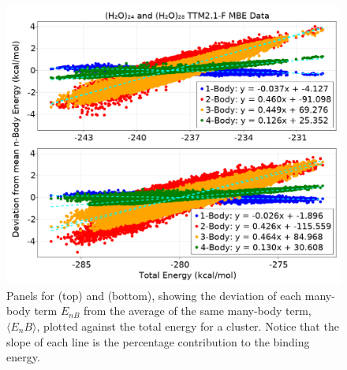 \begin{figure}[t]
\uwsinglespace
\begin{center}
\includegraphics[width=.8\textwidth]{Figures/Chapter_6/w24_and_w28_mbe_ttm21f_deviation.png}
\end{center}
\begin{spacing}{1.0}
\caption[Panels for  (top) and  (bottom), showing the deviation of each many-body term $E_{nB}$ from the average of the same many-body term, $\langle E_nB\rangle$, plotted against the total energy for a cluster. Notice that the slope of each line is the percentage contribution to the binding energy.]{Panels for  (top) and  (bottom), showing the deviation of each many-body term $E_{nB}$ from the average of the same many-body term, $\langle E_nB\rangle$, plotted against the total energy for a cluster. Notice that the slope of each line is the percentage contribution to the binding energy.}\label{fig:MBE_III_F5}
\end{spacing}
\end{figure}
